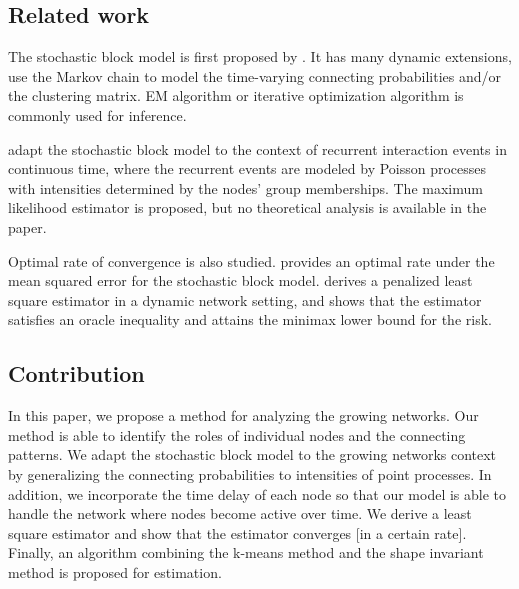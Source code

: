 \subsection*{Related work}
	The stochastic block model is first proposed by \citet{Holland1983}.
	It has many dynamic extensions,
	\citet{Yang2011,Xu2014a,Matias2016,Xu2015} use the Markov chain to model the time-varying  connecting probabilities and/or the clustering matrix. 
	EM algorithm or iterative optimization algorithm is commonly used for inference.

	 \citet{Matias2018} adapt the stochastic block model to the context of recurrent interaction events in continuous time, 
	where the recurrent events are modeled by Poisson processes with intensities determined by the nodes' group memberships. 
	The maximum likelihood estimator is proposed, but no theoretical analysis is available in the paper. 

	Optimal rate of convergence is also studied.
	\citet{Gao2015a} provides an optimal rate under the mean squared error for the stochastic block model.
	\citet{Pensky2019a} 
	derives a penalized least square estimator in a dynamic network setting, and shows that the estimator satisfies an oracle inequality and  attains the minimax lower bound for the risk.





\subsection*{Contribution}
	In this paper, we propose a method for analyzing the growing networks. Our method is able to identify the roles of individual nodes and the connecting patterns.
	We adapt the stochastic block model to the growing networks context by generalizing the connecting probabilities to intensities of point processes. 
	In addition, we incorporate the time delay of each node so that our model is able to handle the network where nodes become active over time.
	We derive a least square estimator and show that the estimator converges [in a certain rate].
	Finally, an algorithm combining the k-means method and the shape invariant method is proposed for estimation.



